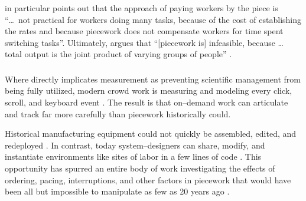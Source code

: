 \documentclass[trackingWork]{subfiles}
\begin{document}
\citeauthor{bewley1999wages} in particular points out that
the approach of paying workers by the piece is
``\dots~not practical for workers doing many tasks, because of
the cost of establishing the rates and because
piecework does not compensate workers for time spent switching tasks''.
Ultimately, \citeauthor{bewley1999wages} argues that
``[piecework is] infeasible, because \dots
total output is the joint product of varying groups of people''
\cite{bewley1999wages}.


\subsubsection{\whatchanged}
\begin{comment}
outline
	- measurement is more precise, so decomposition is deeper
	- not a single position, but a marketplace
\end{comment}

Where \citeauthor{10.2307/23702539} directly implicates measurement as
preventing scientific management from being fully utilized,
modern crowd work is measuring and modeling every click, scroll, and keyboard event
\cite{rzeszotarski2011instrumenting,rzeszotarski2012crowdscape}.
The result is that on--demand work can articulate and track far more carefully than piecework historically could.

Historical manufacturing equipment could not quickly be assembled, edited, and redeployed
\cite{hu1961parallel}.
In contrast, today system--designers can share, modify, and instantiate environments
like sites of labor in a few lines of code
\cite{lessig2006code,turkitLittle}.
This opportunity has spurred an entire body of work investigating the effects of
ordering,
pacing,
interruptions, and
other factors in piecework that would have been
all but impossible to manipulate as few as 20 years ago
\cite{dai2015and,Cai:2016:CRI:2858036.2858237,cheng2015break,measuringCrowdsourcingCheng,embracingErrorKrishna}.
 
\end{document}
